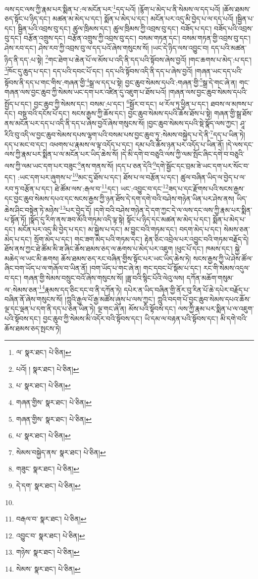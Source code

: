 ལས་དང་ལས་ཀྱི་རྣམ་པར་སྨིན་པ་:ལ་མངོན་པར་\footnote{ལ་  སྣར་ཐང་།  པེ་ཅིན། }དད་པའོ། །རྙོག་པ་མེད་པ་ནི་སེམས་ལ་དད་པའོ། །ཆོས་ཐམས་ཅད་སྟོང་པ་ཉིད་དང་། མཚན་མ་མེད་པ་དང་། སྨོན་པ་མེད་པ་དང་། མངོན་པར་འདུ་མི་བྱེད་པ་ལ་དད་པའོ། །སྦྱིན་པ་དང་། སྦྱིན་པའི་འབྲས་བུ་དང་། ཚུལ་ཁྲིམས་དང་། ཚུལ་ཁྲིམས་ཀྱི་འབྲས་བུ་དང་། བཟོད་པ་དང་། བཟོད་པའི་འབྲས་བུ་དང་། བརྩོན་འགྲུས་དང་། བརྩོན་འགྲུས་ཀྱི་འབྲས་བུ་དང་། བསམ་གཏན་དང་། བསམ་གཏན་གྱི་འབྲས་བུ་དང་། ཤེས་རབ་དང་། ཤེས་རབ་ཀྱི་འབྲས་བུ་ལ་དད་པའོ་ཞེས་གསུངས་སོ། །ཡང་དེ་ཉིད་ལས་འབྱུང་བ། དད་པའི་མཚན་ཉིད་ནི་དད་:པ་སྟེ། \footnote{པའོ། །   སྣར་ཐང་།  པེ་ཅིན། }གང་ཐེག་པ་ཆེན་པོ་ལ་མོས་པ་འདི་ནི་དད་པའི་སྟོབས་ཞེས་བྱའོ། །གང་ཆགས་པ་མེད་:པ་དང་། \footnote{པ་  སྣར་ཐང་།  པེ་ཅིན། }ཁོང་དུ་ཆུད་པ་དང་། དད་པའི་དབང་པོ་དང་། དད་པའི་སྟོབས་འདི་ནི་དད་པ་ཞེས་བྱའོ། །གཞན་ཡང་དད་པའི་སྟོབས་ནི་དད་པ་གང་གིས་:གཞན་གྱི་\footnote{གཞན་གྱིས་  སྣར་ཐང་།  པེ་ཅིན། }སྒྲ་ལ་དད་པ་སྟེ། བྱང་ཆུབ་སེམས་དཔའི་:གཞན་གྱི་\footnote{གཞན་གྱིས་  སྣར་ཐང་།  པེ་ཅིན། }སྒྲ་དེ་གང་ཞེ་ན། གང་གཞན་ལས་བྱང་ཆུབ་ཀྱི་སེམས་ཡང་དག་པར་འཛིན་དུ་འཇུག་པ་ཐོས་པའོ། །གཞན་ལས་བྱང་ཆུབ་སེམས་དཔའི་སྤྱོད་པ་དང་། བྱང་ཆུབ་ཀྱི་སེམས་དང་། བསམ་:པ་དང་། \footnote{པ་  སྣར་ཐང་།  པེ་ཅིན། }སྦྱོར་བ་དང་། ཕ་རོལ་ཏུ་ཕྱིན་པ་དང་། ཐབས་ལ་མཁས་པ་དང་། བསྡུ་བའི་དངོས་པོ་དང་། སངས་རྒྱས་ཀྱི་ཆོས་དང་། བྱང་ཆུབ་སེམས་དཔའི་ཆོས་ཐོས་པ་སྟེ། གཞན་གྱི་སྒྲ་ཐོས་ནས་མངོན་པར་དད་པ་འདི་ནི་དད་པ་ཞེས་བྱའོ་ཞེས་གསུངས་སོ། །བྱང་ཆུབ་སེམས་དཔའི་སྡེ་སྣོད་ལས་ཀྱང་། ཤཱ་རིའི་བུ་འདི་ལ་བྱང་ཆུབ་སེམས་དཔས་ལྷག་པའི་བསམ་པས་བྱང་ཆུབ་ཏུ་:སེམས་བསྐྱེད་པ་དེ་ནི་\footnote{སེམས་བསྐྱེད་ནས་  སྣར་ཐང་།  པེ་ཅིན། }དད་པ་ཡིན་ཏེ། དད་པ་མང་བ་དང་། འཕགས་པ་རྣམས་ལ་ལྟ་འདོད་པ་དང་། དམ་པའི་ཆོས་ཉན་པར་འདོད་པ་ཡིན་ནོ། །དེ་ལས་དང་ལས་ཀྱི་རྣམ་པར་སྨིན་པ་ལ་མངོན་པར་ཡིད་ཆེས་སོ། །དེ་མི་དགེ་བ་བཅུའི་ལས་ཀྱི་ལམ་སྤོང་ཞིང་དགེ་བ་བཅུའི་ལས་ཀྱི་ལམ་ཡང་དག་པར་བཟུང་\footnote{གཟུང་  སྣར་ཐང་།  པེ་ཅིན། }ནས་གནས་སོ། །དད་པ་ཅན་དེའི་\footnote{དེ་དག་  སྣར་ཐང་།  པེ་ཅིན། }དགེ་སྦྱོང་དང་བྲམ་ཟེ་ཡང་དག་པར་སོང་བ་དང་། :ཡང་དག་པར་ཞུགས་པ་\footnote{}མང་དུ་ཐོས་པ་དང་། ཐོས་པ་ལ་བརྩོན་པ་དང་། ཚུལ་བཞིན་ཡིད་ལ་བྱེད་པ་ལ་རབ་ཏུ་བརྩོན་པ་དང་། ཐེ་ཚོམ་ལས་:རྒལ་བ་\footnote{བརྒལ་བ་  སྣར་ཐང་།  པེ་ཅིན། }དང་། ཡང་:འབྱུང་བ་དང་\footnote{འབྱུང་བ་  སྣར་ཐང་།  པེ་ཅིན། }ཟད་པ་དང་རྫོགས་པའི་སངས་རྒྱས་དང་བྱང་ཆུབ་སེམས་དཔའ་དང་སངས་རྒྱས་ཀྱི་ཉན་ཐོས་དེ་དག་དགེ་བའི་བཤེས་གཉེན་ཡིན་པར་ཤེས་ནས། ཡིད་ཆེས་ཤིང་བསྟེན་ཏེ་མཉེས་\footnote{གཉེས་  སྣར་ཐང་།  པེ་ཅིན། }པར་བྱེད་དོ། །དགེ་བའི་བཤེས་གཉེན་དེ་དག་ཀྱང་དེ་ལ་ལས་དང་ལས་ཀྱི་རྣམ་པར་སྨིན་པ་སྟོན་ཏོ། །སྣོད་དུ་རིག་ནས་ཟབ་མོའི་གཏམ་འདི་ལྟ་སྟེ། སྟོང་པ་ཉིད་དང་མཚན་མ་མེད་པ་དང་། སྨོན་པ་མེད་པ་དང་། མངོན་པར་འདུ་མི་བྱེད་པ་དང་། མ་སྐྱེས་པ་དང་། མ་བྱུང་བའི་གཏམ་དང་། བདག་མེད་པ་དང་། སེམས་ཅན་མེད་པ་དང་། སྲོག་མེད་པ་དང་། གང་ཟག་མེད་པའི་གཏམ་དང་། རྟེན་ཅིང་འབྲེལ་པར་འབྱུང་བའི་གཏམ་བརྗོད་དེ། ཐོས་ནས་ཀྱང་ཐེ་ཚོམ་མི་ཟ་ཞིང་ཆོས་ཐམས་ཅད་ལ་ཆགས་པ་མེད་པར་འཇུག །ཕུང་པོ་དང་། ཁམས་དང་། སྐྱེ་མཆེད་ལ་ཡང་མི་ཆགས། ཆོས་ཐམས་ཅད་རང་བཞིན་གྱིས་སྟོང་པར་ཡང་ཡིད་ཆེས་ཏེ། སངས་རྒྱས་ཀྱི་ཡེ་ཤེས་ཚོལ་ཞིང་བག་ཡོད་པ་ལ་གཞོལ་བ་ཡིན་ནོ། །བག་ཡོད་པ་གང་ཞེ་ན། གང་དབང་པོ་སྡོམ་པ་དང་། རང་གི་སེམས་འདུལ་བ་དང་། གཞན་གྱི་སེམས་བསྲུང་བའོ་ཞེས་གསུངས་སོ། །ཟླ་བའི་སྙིང་པོའི་ལེའུ་ལས། དཀོན་མཆོག་གསུམ་ལ་:སེམས་ཅན་\footnote{སེམས་  སྣར་ཐང་།  པེ་ཅིན། }རྣམས་དད་ཅིང་དང་བ་ནི་དཀོན་ཏེ། དཔེར་ན་ཡིད་བཞིན་གྱི་ནོར་བུ་རིན་པོ་ཆེ་དཔེར་བརྗོད་པ་བཞིན་ནོ་ཞེས་གསུངས་སོ། །ཀླུའི་རྒྱལ་པོ་རྒྱ་མཚོས་ཞུས་པ་ལས་ཀྱང་། ཀླུའི་བདག་པོ་བྱང་ཆུབ་སེམས་དཔའ་ཆོས་ལྔ་དང་ལྡན་པ་དག་ནི་དད་པ་ཅན་ཡིན་ཏེ། ལྔ་གང་ཞེ་ན། མོས་པའི་སྟོབས་དང་། ལས་ཀྱི་རྣམ་པར་སྨིན་པ་ལ་འཇུག་པའི་སྟོབས་དང་། བྱང་ཆུབ་ཀྱི་སེམས་མི་འདོར་བའི་སྟོབས་དང་། ཡི་དམ་ལ་བརྟན་པའི་སྟོབས་དང་། མི་དགེ་བའི་ཆོས་ཐམས་ཅད་སྤངས་ཏེ། 